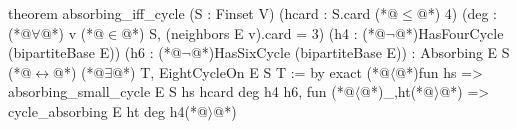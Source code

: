 theorem absorbing_iff_cycle (S : Finset V) (hcard : S.card (*@$\le$@*) 4)
    (deg : (*@$\forall$@*) v (*@$\in$@*) S, (neighbors E v).card = 3)
    (h4 : (*@$\neg$@*)HasFourCycle (bipartiteBase E))
    (h6 : (*@$\neg$@*)HasSixCycle (bipartiteBase E)) :
    Absorbing E S (*@$\leftrightarrow$@*) (*@$\exists$@*) T, EightCycleOn E S T := by
  exact (*@$\langle$@*)fun hs => absorbing_small_cycle E S hs hcard deg h4 h6,
    fun (*@$\langle$@*)_,ht(*@$\rangle$@*) => cycle_absorbing E ht deg h4(*@$\rangle$@*)
